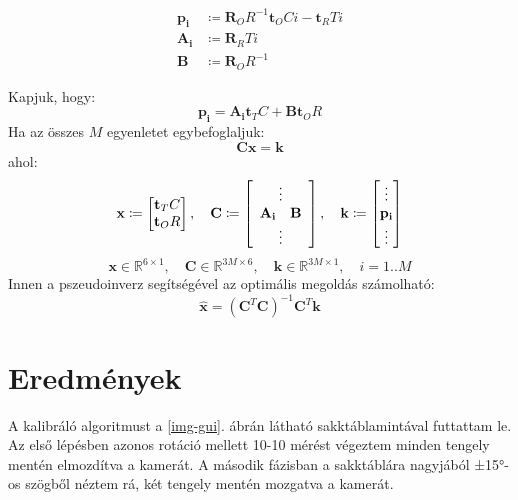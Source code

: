 \documentclass{article}
\begin{document}
	\begin{equation}
	\begin{split}
	\mathbf{p_i} &\coloneqq \mathbf{R}_OR^{-1} \mathbf{t}_OCi -  \mathbf{t}_RTi \\
	\mathbf{A_i} &\coloneqq  \mathbf{R}_RTi\\
	\mathbf{B} &\coloneqq  \mathbf{R}_OR^{-1}
	\end{split}
	\end{equation}
	
	Kapjuk, hogy:
	\begin{equation}
	\mathbf{p_i} =  \mathbf{A_i}\mathbf{t}_TC+\mathbf{B}\mathbf{t}_OR
	\end{equation}
	Ha az összes $M$ egyenletet egybefoglaljuk:
	\begin{equation}
	\mathbf{Cx} = \mathbf{k}
	\end{equation}
	ahol:
	\begin{equation}
	\mathbf{x} \coloneqq \left[ \begin{matrix} \mathbf{t}_TC \\ \mathbf{t}_OR\end{matrix}	 \right], \quad
	\mathbf{C} \coloneqq  \left[ \begin{array}{cc} \multicolumn{2}{c}{\vdots} \\ \mathbf{A_i} & \mathbf{B} \\ \multicolumn{2}{c}{\vdots}  \end{array} \right], \quad
	\mathbf{k} \coloneqq  \left[ \begin{matrix} \vdots \\ \mathbf{p_i} \\ \vdots \end{matrix} \right] 
	\end{equation}
	\begin{equation*}
	\mathbf{x} \in \mathbb{R}^{6 \times 1}, \quad
	\mathbf{C} \in \mathbb{R}^{3M \times 6}, \quad
	\mathbf{k} \in \mathbb{R}^{3M \times 1}, \quad
	i = 1..M
	\end{equation*}
	Innen a pszeudoinverz segítségével az optimális megoldás számolható:
	\begin{equation}
	\hat{\mathbf{x}} = \left(\mathbf{C}^T \mathbf{C}\right)^{-1}\mathbf{C}^T\mathbf{k}
	\end{equation}
	\section{Eredmények}
	A kalibráló algoritmust a \ref{img-gui}. ábrán látható sakktáblamintával futtattam le. Az első lépésben azonos rotáció mellett 10-10 mérést végeztem minden tengely mentén elmozdítva a kamerát. A második fázisban a sakktáblára nagyjából ±15°-os szögből néztem rá, két tengely mentén mozgatva a kamerát.
	
\end{document}
